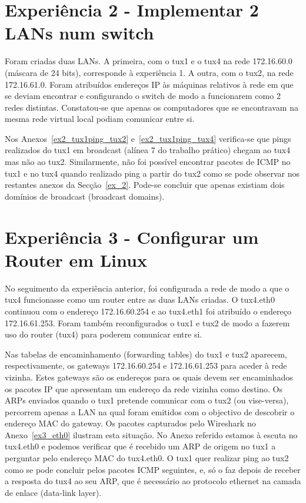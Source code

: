 \documentclass[11pt,a4paper,reqno]{report}
\numberwithin{equation}{section}
\begin{document}
\section{Experiência 2 - Implementar 2 LANs num switch}

Foram criadas duas LANs. A primeira, com o tux1 e o tux4 na rede 172.16.60.0 (máscara de 24 bits), corresponde à experiência 1. A outra, com o tux2, na rede 172.16.61.0. Foram atribuídos endereços IP às máquinas relativos à rede em que se deviam encontrar e configurando o switch de modo a funcionarem como 2 redes distintas. Constatou-se que apenas os computadores que se encontravam na mesma rede virtual local podiam comunicar entre si. 

Nos Anexos~\ref{ex2_tux1ping_tux2} e~\ref{ex2_tux1ping_tux4} verifica-se que pings realizados do tux1 em broadcast (alínea 7 do trabalho prático) chegam ao tux4 mas não ao tux2. Similarmente, não foi possível encontrar pacotes de ICMP no tux1 e no tux4 quando realizado ping a partir do tux2 como se pode observar nos restantes anexos da Secção~\ref{ex_2}. Pode-se concluir que apenas existiam dois domínios de broadcast (broadcast domains).


\section{Experiência 3 - Configurar um Router em Linux}

No seguimento da experiência anterior, foi configurada a rede de modo a que o tux4 funcionasse como um router entre as duas LANs criadas. O tux4.eth0 continuou com o endereço 172.16.60.254 e ao tux4.eth1 foi atribuído o endereço 172.16.61.253. Foram também reconfigurados o tux1 e tux2 de modo a fazerem uso do router (tux4) para poderem comunicar entre si.

Nas tabelas de encaminhamento (forwarding tables) do tux1 e tux2 aparecem, respectivamente, os gateways 172.16.60.254 e 172.16.61.253 para aceder à rede vizinha. Estes gateways são os endereços para os quais devem ser encaminhados os pacotes IP que apresentam um endereço da rede vizinha como destino. Os ARPs enviados quando o tux1 pretende comunicar com o tux2 (ou vise-versa), percorrem apenas a LAN na qual foram emitidos com o objectivo de descobrir o endereço MAC do gateway. Os pacotes capturados pelo Wireshark no Anexo~\ref{ex3_eth0} ilustram esta situação. No Anexo referido estamos à escuta no tux4.eth0 e podemos verificar que é recebido um ARP de origem no tux1 a perguntar pelo endereço MAC do tux4.eth0. O tux1 quer realizar ping ao tux2 como se pode concluir pelos pacotes ICMP seguintes, e, só o faz depois de receber a resposta do tux4 ao seu ARP, que é necessário ao protocolo ethernet na camada de enlace (data-link layer).
\end{document}
